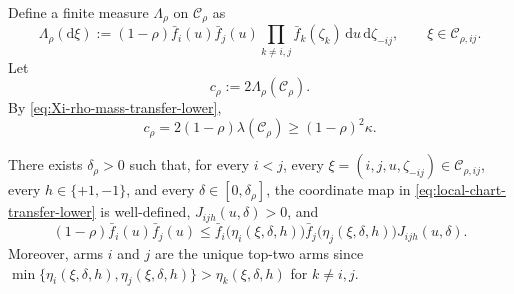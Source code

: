 \documentclass[10pt]{article}
\newcommand{\dd}{\mathrm{d}}
\theoremstyle{plain}
\begin{document}
Define a finite measure $\Lambda_\rho$ on $\mathcal C_\rho$ as
\begin{equation}
\label{eq:Lambda-rho-transfer-lower}
    \Lambda_\rho(\dd\xi)
    :=
    (1-\rho)
    \bar f_i(u)\bar f_j(u)
    \prod_{k\neq i,j}\bar f_k(\zeta_k)
    \,\dd u\,\dd\zeta_{-ij},
    \qquad
    \xi\in\mathcal C_{\rho,ij}.
\end{equation}
Let
\begin{equation}
\label{eq:c-rho-transfer-lower}
    c_\rho
    :=
    2\Lambda_\rho(\mathcal C_\rho).
\end{equation}
By \eqref{eq:Xi-rho-mass-transfer-lower},
\begin{equation}
\label{eq:c-rho-lower-transfer-lower}
    c_\rho
    =
    2(1-\rho)\lambda(\mathcal C_\rho)
    \ge
    (1-\rho)^2\kappa.
\end{equation}

\begin{lemma}
\label{lem:uniform-density-transfer-lower}
There exists $\delta_\rho>0$ such that, for every $i<j$,
every $\xi=(i,j,u,\zeta_{-ij})\in\mathcal C_{\rho,ij}$,
every $h\in\{+1,-1\}$, and every $\delta\in[0,\delta_\rho]$, the coordinate
map in \eqref{eq:local-chart-transfer-lower} is well-defined,
$J_{ijh}(u,\delta)>0$, and
\begin{equation}
\label{eq:local-density-domination-transfer-lower}
    (1-\rho)\bar f_i(u)\bar f_j(u)
    \le
    \bar f_i\bigl(\eta_i(\xi,\delta,h)\bigr)
    \bar f_j\bigl(\eta_j(\xi,\delta,h)\bigr)
    J_{ijh}(u,\delta).
\end{equation}
Moreover, arms $i$ and $j$ are the unique top-two arms since
    $\min\{
        \eta_i(\xi,\delta,h),
        \eta_j(\xi,\delta,h)
    \}
    >
    \eta_k(\xi,\delta,h)$ for $k\neq i,j$.
\end{lemma}
\end{document}
